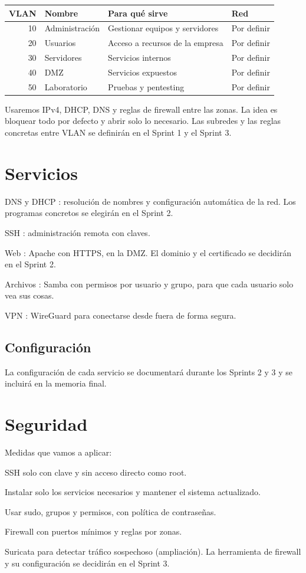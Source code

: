 \documentclass[11pt,a4paper]{report}
\begin{document}
\begin{tabularx}{\textwidth}{|r|l|X|l|}
\hline
\textbf{VLAN} & \textbf{Nombre} & \textbf{Para qué sirve} & \textbf{Red} \\ \hline
10 & Administración & Gestionar equipos y servidores & Por definir \\ \hline
20 & Usuarios & Acceso a recursos de la empresa & Por definir \\ \hline
30 & Servidores & Servicios internos & Por definir \\ \hline
40 & DMZ & Servicios expuestos & Por definir \\ \hline
50 & Laboratorio & Pruebas y pentesting & Por definir \\ \hline
\end{tabularx}

Usaremos IPv4, DHCP, DNS y reglas de firewall entre las zonas. La idea es bloquear todo por defecto y abrir solo lo necesario. Las subredes y las reglas concretas entre VLAN se definirán en el Sprint 1 y el Sprint 3.

\chapter{Servicios}

\par\noindent\textbullet\quad  DNS y DHCP : resolución de nombres y configuración automática de la red. Los programas concretos se elegirán en el Sprint 2. 
\par\noindent\textbullet\quad  SSH : administración remota con claves. 
\par\noindent\textbullet\quad  Web : Apache con HTTPS, en la DMZ. El dominio y el certificado se decidirán en el Sprint 2. 
\par\noindent\textbullet\quad  Archivos : Samba con permisos por usuario y grupo, para que cada usuario solo vea sus cosas. 
\par\noindent\textbullet\quad  VPN : WireGuard para conectarse desde fuera de forma segura. 
\section{Configuración}
 La configuración de cada servicio se documentará durante los Sprints 2 y 3 y se incluirá en la memoria final.

\chapter{Seguridad}
Medidas que vamos a aplicar: 
\par\noindent\textbullet\quad  SSH solo con clave y sin acceso directo como root. 
\par\noindent\textbullet\quad  Instalar solo los servicios necesarios y mantener el sistema actualizado. 
\par\noindent\textbullet\quad  Usar sudo, grupos y permisos, con política de contraseñas. 
\par\noindent\textbullet\quad  Firewall con puertos mínimos y reglas por zonas. 
\par\noindent\textbullet\quad  Suricata para detectar tráfico sospechoso (ampliación). La herramienta de firewall y su configuración se decidirán en el Sprint 3.
\end{document}
